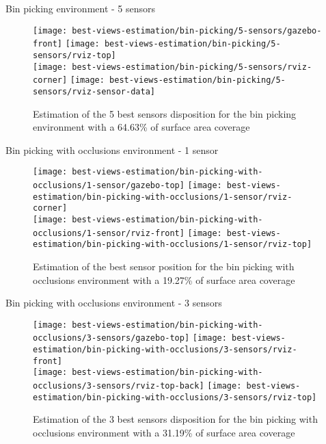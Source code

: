 \begin{frame}{Bin picking environment - 5 sensors}
	\begin{figure}
		\centering
		\texttt{[image: best-views-estimation/bin-picking/5-sensors/gazebo-front]}\hspace{2em}
		\texttt{[image: best-views-estimation/bin-picking/5-sensors/rviz-top]}\\
		\texttt{[image: best-views-estimation/bin-picking/5-sensors/rviz-corner]}\hspace{2em}
		\texttt{[image: best-views-estimation/bin-picking/5-sensors/rviz-sensor-data]}
		\caption{Estimation of the 5 best sensors disposition for the bin picking environment with a 64.63\% of surface area coverage}
	\end{figure}
\end{frame}


\begin{frame}{Bin picking with occlusions environment - 1 sensor}
	\begin{figure}
		\centering
		\texttt{[image: best-views-estimation/bin-picking-with-occlusions/1-sensor/gazebo-top]}\hspace{2em}
		\texttt{[image: best-views-estimation/bin-picking-with-occlusions/1-sensor/rviz-corner]}\\
		\texttt{[image: best-views-estimation/bin-picking-with-occlusions/1-sensor/rviz-front]}\hspace{4em}
		\texttt{[image: best-views-estimation/bin-picking-with-occlusions/1-sensor/rviz-top]}
		\caption{Estimation of the best sensor position for the bin picking with occlusions environment with a 19.27\% of surface area coverage}
	\end{figure}
\end{frame}


\begin{frame}{Bin picking with occlusions environment - 3 sensors}
	\begin{figure}
		\centering
		\texttt{[image: best-views-estimation/bin-picking-with-occlusions/3-sensors/gazebo-top]}\hspace{2em}
		\texttt{[image: best-views-estimation/bin-picking-with-occlusions/3-sensors/rviz-front]}\\
		\texttt{[image: best-views-estimation/bin-picking-with-occlusions/3-sensors/rviz-top-back]}\hspace{4em}
		\texttt{[image: best-views-estimation/bin-picking-with-occlusions/3-sensors/rviz-top]}
		\caption{Estimation of the 3 best sensors disposition for the bin picking with occlusions environment with a 31.19\% of surface area coverage}
	\end{figure}
\end{frame}


